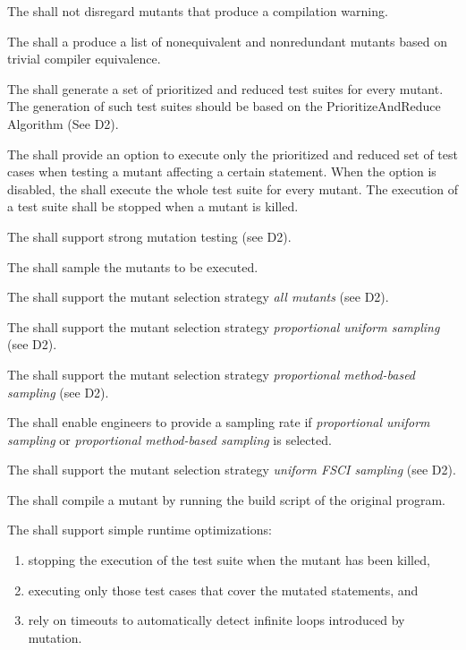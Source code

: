 \RQ{} The \FAQAS shall not disregard mutants that produce a compilation warning.

\RQ{} The \FAQAS shall a produce a list of nonequivalent and nonredundant mutants based on trivial compiler equivalence. 

\RQ{} The \FAQAS shall generate a set of prioritized and reduced test suites for every mutant.
The generation of such test suites should be  based on the PrioritizeAndReduce Algorithm (See D2).

\RQ{} The \FAQAS shall provide an option to execute only the prioritized and reduced set of test cases when testing a mutant affecting a certain statement. When the option is disabled, the \FAQAS shall execute the whole test suite for every mutant. The execution of a test suite shall be stopped when a mutant is killed.

\RQ{} The \FAQAS shall support strong mutation testing (see D2).

\RQ{} The \FAQAS shall sample the mutants to be executed.

\RQ{} The \FAQAS shall support the mutant selection strategy \textit{all mutants} (see D2).

\RQ{} The \FAQAS shall support the mutant selection strategy \textit{proportional uniform sampling} (see D2).

\RQ{} The \FAQAS shall support the mutant selection strategy \textit{proportional method-based sampling} (see D2).

\RQ{} The \FAQAS shall enable engineers to provide a sampling rate if \textit{proportional uniform sampling} or \textit{proportional method-based sampling} is selected.

\RQ{} The \FAQAS shall support the mutant selection strategy \textit{uniform FSCI sampling} (see D2).

\RQ{} The \FAQAS shall compile a mutant by running the build script of the original program.

\RQ{} The \FAQAS shall support simple runtime optimizations:
\begin{enumerate}
	\item stopping the execution of the test suite when the mutant has been killed,
	\item executing only those test cases that cover the mutated statements, and 
	\item rely on timeouts to automatically detect infinite loops introduced by mutation.
\end{enumerate}

